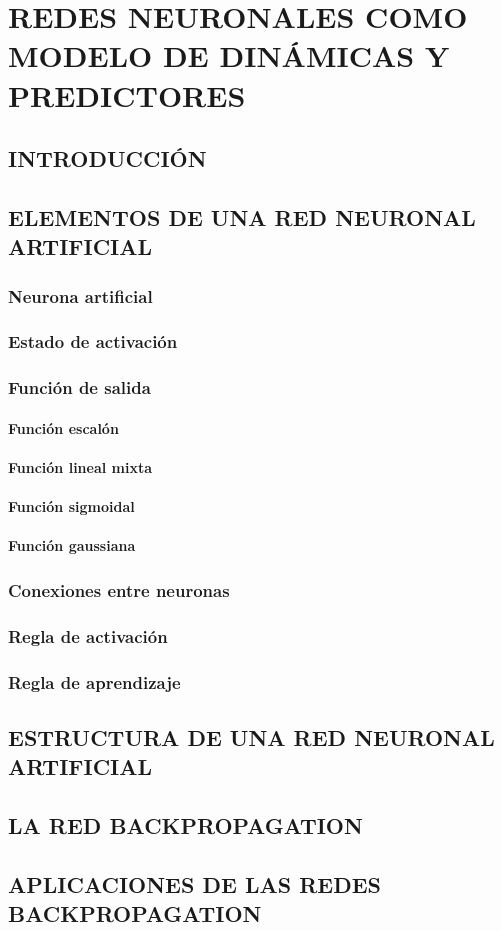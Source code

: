 \renewcommand{\theequation}{\arabic{chapter}-\arabic{equation}}

\chapter{REDES NEURONALES COMO MODELO DE DINÁMICAS Y PREDICTORES}

\section{INTRODUCCIÓN}\label{sec:intro1}

\section{ELEMENTOS DE UNA RED NEURONAL ARTIFICIAL}\label{sec:elemsred}
\subsection{Neurona artificial}
\subsection{Estado de activación}
\subsection{Función de salida}
\subsubsection{Función escalón}
\subsubsection{Función lineal mixta}
\subsubsection{Función sigmoidal}
\subsubsection{Función gaussiana}
\subsection{Conexiones entre neuronas}
\subsection{Regla de activación}
\subsection{Regla de aprendizaje}

\section{ESTRUCTURA DE UNA RED NEURONAL ARTIFICIAL}

\section{LA RED BACKPROPAGATION}

\section{APLICACIONES DE LAS REDES BACKPROPAGATION}
